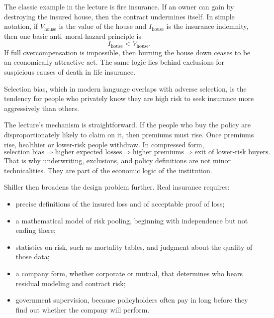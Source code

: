 The classic example in the lecture is fire insurance. If an owner can gain by destroying the insured house, then the contract undermines itself. In simple notation, if \(V_{\text{house}}\) is the value of the house and \(I_{\text{house}}\) is the insurance indemnity, then one basic anti--moral-hazard principle is
\begin{equation}
I_{\text{house}} < V_{\text{house}}.
\end{equation}
If full overcompensation is impossible, then burning the house down ceases to be an economically attractive act. The same logic lies behind exclusions for suspicious causes of death in life insurance.

\begin{definition}
Selection bias, which in modern language overlaps with adverse selection, is the tendency for people who privately know they are high risk to seek insurance more aggressively than others.
\end{definition}

The lecture's mechanism is straightforward. If the people who buy the policy are disproportionately likely to claim on it, then premiums must rise. Once premiums rise, healthier or lower-risk people withdraw. In compressed form,
\begin{equation}
\text{selection bias} \Longrightarrow \text{higher expected losses} \Longrightarrow \text{higher premiums} \Longrightarrow \text{exit of lower-risk buyers}.
\end{equation}
That is why underwriting, exclusions, and policy definitions are not minor technicalities. They are part of the economic logic of the institution.

Shiller then broadens the design problem further. Real insurance requires:
\begin{itemize}
\item precise definitions of the insured loss and of acceptable proof of loss;
\item a mathematical model of risk pooling, beginning with independence but not ending there;
\item statistics on risk, such as mortality tables, and judgment about the quality of those data;
\item a company form, whether corporate or mutual, that determines who bears residual modeling and contract risk;
\item government supervision, because policyholders often pay in long before they find out whether the company will perform.
\end{itemize}

